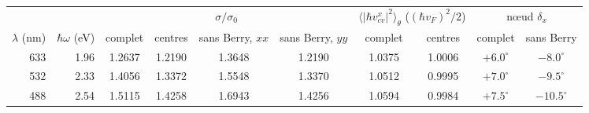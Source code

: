{\setlength{\tabcolsep}{4pt}%
\begin{tabular}{rr cccc cc cc}
\toprule
 & & \multicolumn{4}{c}{$\sigma/\sigma_0$} & \multicolumn{2}{c}{$\langle|\hbar v^x_{cv}|^2\rangle_\theta$ ($(\hbar v_F)^2/2$)} & \multicolumn{2}{c}{nœud $\delta_x$} \\
\cmidrule(lr){3-6}\cmidrule(lr){7-8}\cmidrule(lr){9-10}
$\lambda$ (nm) & $\hbar\omega$ (eV) & complet & centres & sans Berry, $xx$ & sans Berry, $yy$ & complet & centres & complet & sans Berry \\
\midrule
633 & 1.96 & 1.2637 & 1.2190 & 1.3648 & 1.2190 & 1.0375 & 1.0006 & $+6.0^\circ$ & $-8.0^\circ$ \\
532 & 2.33 & 1.4056 & 1.3372 & 1.5548 & 1.3370 & 1.0512 & 0.9995 & $+7.0^\circ$ & $-9.5^\circ$ \\
488 & 2.54 & 1.5115 & 1.4258 & 1.6943 & 1.4256 & 1.0594 & 0.9984 & $+7.5^\circ$ & $-10.5^\circ$ \\
\bottomrule
\end{tabular}}
